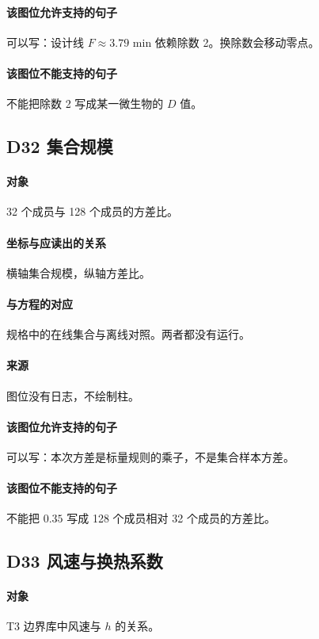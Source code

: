 \paragraph{该图位允许支持的句子}
可以写：设计线 $F\approx 3.79$ min 依赖除数 2。换除数会移动零点。

\paragraph{该图位不能支持的句子}
不能把除数 2 写成某一微生物的 $D$ 值。

\subsection{D32 集合规模}
\paragraph{对象}
32 个成员与 128 个成员的方差比。

\paragraph{坐标与应读出的关系}
横轴集合规模，纵轴方差比。

\paragraph{与方程的对应}
规格中的在线集合与离线对照。两者都没有运行。

\paragraph{来源}
图位没有日志，不绘制柱。

\paragraph{该图位允许支持的句子}
可以写：本次方差是标量规则的乘子，不是集合样本方差。

\paragraph{该图位不能支持的句子}
不能把 $0.35$ 写成 128 个成员相对 32 个成员的方差比。

\subsection{D33 风速与换热系数}
\paragraph{对象}
T3 边界库中风速与 $h$ 的关系。

